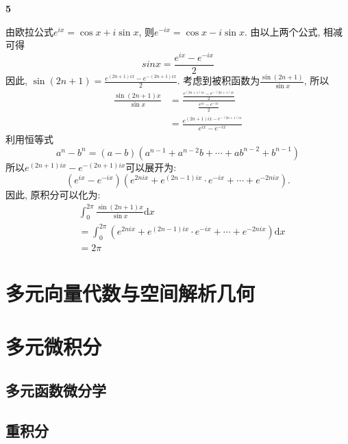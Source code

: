 \documentclass[12pt]{article}
\newenvironment{solution}[2][Solution]{\begin{trivlist}
\item[\hskip \labelsep {\bfseries #1}]}{\end{trivlist}}
\begin{document}
\begin{solution}{5} \textbf{5}
    
    由欧拉公式$e^{ix} = \cos x + i\sin x$, 则$e^{-ix} = \cos x - i\sin x$. 由以上两个公式, 相减可得
    \begin{equation} \label{}
        sinx = \frac{e^{ix} - e^{-ix}}{2}    
    \end{equation}
    因此, $\sin(2n+1) = \frac{e^{(2n+1)ix} - e^{-(2n+1)ix}}{2}$. 考虑到被积函数为$\frac{\sin(2n+1)}{\sin x}$, 所以
    \[
        \begin{aligned}
            \frac{\sin(2n+1)x}{\sin x} &= \frac{\frac{e^{(2n+1)ix}-e^{-(2n+1)ix}}{2}}{\frac{e^{ix} - e^{-ix}}{2}} \\
            &= \frac{e^{(2n+1)ix - e^{-(2n+1)ix}}}{e^{ix} - e^{-ix}}    
        \end{aligned}
    \]
    利用恒等式
    \[
        a^n - b^n = (a-b)(a^{n-1} + a^{n-2}b + \cdots + ab^{n-2} + b^{n-1})    
    \]
    所以$e^{(2n+1)ix} - e^{-(2n+1)ix}$可以展开为:
    \[
        (e^{ix} - e^{-ix})(e^{2nix} + e^{(2n-1)ix}\cdot e^{-ix} + \cdots + e^{-2nix}).    
    \]
    因此, 原积分可以化为:
    \[
        \begin{aligned}
            &\int_0^{2\pi} \frac{\sin(2n+1)x}{\sin x}\mathrm{d}x \\
            &= \int_0^{2\pi} \left( e^{2nix} + e^{(2n-1)ix}\cdot e^{-ix} + \cdots + e^{-2nix} \right)\mathrm{d}x \\
            &= 2\pi
        \end{aligned}    
    \]
\end{solution}


\section{多元向量代数与空间解析几何}


\section{多元微积分}

\subsection{多元函数微分学}


\subsection{重积分}
\end{document}

